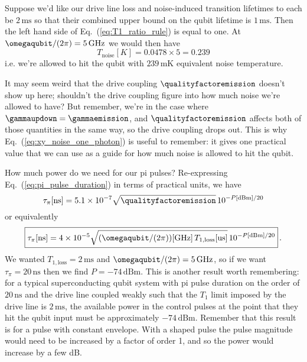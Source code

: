 Suppose we'd like our drive line loss and noise-induced transition lifetimes to each be $2 \, \text{ms}$ so that their combined upper bound on the qubit lifetime is $1 \, \text{ms}$.
Then the left hand side of Eq.~(\ref{eq:T1_ratio_rule}) is equal to one.
At $\omegaqubit / (2\pi) = 5 \, \text{GHz}$ we would then have
\begin{displaymath}
  T_\text{noise}[K] = 0.0478 \times 5 = 0.239
\end{displaymath}
i.e. we're allowed to hit the qubit with $239\,\text{mK}$ equivalent noise temperature.

It may seem weird that the drive coupling $\qualityfactoremission$ doesn't show up here; shouldn't the drive coupling figure into how much noise we're allowed to have?
But remember, we're in the case where $\gammaupdown = \gammaemission$, and $\qualityfactoremission$ affects both of those quantities in the same way, so the drive coupling drops out.
This is why Eq.~(\ref{eq:xy_noise_one_photon}) is useful to remember: it gives one practical value that we can use as a guide for how much noise is allowed to hit the qubit. 

How much power do we need for our pi pulses?
Re-expressing Eq.~(\ref{eq:pi_pulse_duration}) in terms of practical units, we have
\begin{equation}
  \tau_\pi[\text{ns}] = 5.1\times 10^{-7} \sqrt{\qualityfactoremission} \, 10^{-P[\text{dBm}]/20}
\end{equation}
or equivalently
\begin{equation}
  \boxed{
    \tau_\pi[\text{ns}] = 4 \times 10^{-5} \sqrt{(\omegaqubit/(2\pi))[\text{GHz}] \, T_{1, \text{loss}}[\text{us}]} \, 10^{-P[\text{dBm}]/20}
  }
  \, .
\end{equation}
We wanted $T_{1, \text{loss}} = 2\,\text{ms}$ and $\omegaqubit/(2\pi) = 5\,\text{GHz}$, so if we want $\tau_\pi = 20 \, \text{ns}$ then we find $P = -74 \, \text{dBm}$.
This is another result worth remembering: for a typical superconducting qubit system with pi pulse duration on the order of $20\,\text{ns}$ and the drive line coupled weakly such that the $T_1$ limit imposed by the drive line is $2\,\text{ms}$, the available power in the control pulses at the point that they hit the qubit input must be approximately $-74\,\text{dBm}$.  
Remember that this result is for a pulse with constant envelope.
With a shaped pulse the pulse magnitude would need to be increased by a factor of order 1, and so the power would increase by a few dB.

